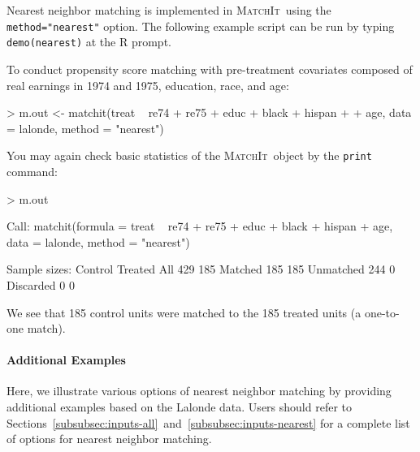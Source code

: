 \documentclass[oneside,letterpaper,titlepage]{article}
\newcommand{\MatchIt}{\textsc{MatchIt}}
\begin{document}
Nearest neighbor matching is implemented in \MatchIt\ using the
\texttt{method="nearest"} option.  The following example script can be
run by typing {\tt demo(nearest)} at the R prompt.

To conduct propensity score matching with pre-treatment covariates
composed of real earnings in 1974 and 1975, education, race, and age:
\begin{Schunk}
\begin{Sinput}
> m.out <- matchit(treat ~ re74 + re75 + educ + black + hispan + 
+     age, data = lalonde, method = "nearest")
\end{Sinput}
\end{Schunk}
You may again check basic statistics of the \MatchIt\ object by the
\texttt{print} command:
\begin{Schunk}
\begin{Sinput}
> m.out
\end{Sinput}
\begin{Soutput}
Call: 
matchit(formula = treat ~ re74 + re75 + educ + black + hispan + 
    age, data = lalonde, method = "nearest")

Sample sizes:
          Control Treated
All           429     185
Matched       185     185
Unmatched     244       0
Discarded       0       0
\end{Soutput}
\end{Schunk}
We see that 185 control units were matched to the 185 treated units
(a one-to-one match).  

\paragraph{Additional Examples}

Here, we illustrate various options of nearest neighbor matching by
providing additional examples based on the Lalonde data. Users should
refer to
Sections~\ref{subsubsec:inputs-all}~and~\ref{subsubsec:inputs-nearest}
for a complete list of options for nearest neighbor matching.
\end{document}
